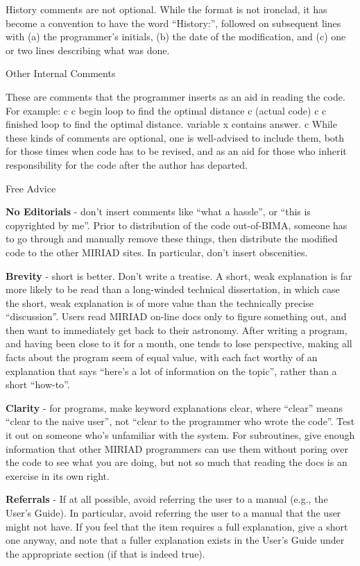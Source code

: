 History comments are not optional.  While the format is not ironclad, it has
become a convention to have the word ``History:'', followed on subsequent
lines with (a) the programmer's initials, (b) the date of the modification,
and (c) one or two lines describing what was done.

\beginsection Other Internal Comments

These are comments that the programmer inserts as an aid in reading the
code.  For example:
{\ninepoint\begintt
c
c begin loop to find the optimal distance
c
    (actual code)
c
c finished loop to find the optimal distance.  variable x contains answer.
c
\endtt}
While these kinds of comments are optional, one is well-advised to include
them, both for those times when code has to be revised, and as an aid for
those who inherit responsibility for the code after the author has departed.

\beginsection Free Advice

{\bf No Editorials} - don't insert comments like ``what a hassle'', or
``this is copyrighted by me''.  Prior to distribution of the code out-of-BIMA,
someone has to go through and manually remove these things, then distribute
the modified code to the other MIRIAD sites.  In particular, don't
insert obscenities.

{\bf Brevity} - short is better.  Don't write a treatise.  A
short, weak explanation is far more likely to be read than a long-winded
technical dissertation, in which case the short, weak explanation is of more
value than the technically precise ``discussion''.  Users read MIRIAD
on-line docs only to figure something out, and then want to immediately get
back to their astronomy.  After writing a program, and having been close to
it for a month, one tends to lose perspective, making all facts about the
program seem of equal value, with each fact worthy of an explanation that
says ``here's a lot of information on the topic'', rather than a short
``how-to''.

{\bf Clarity} - for programs, make keyword explanations
clear, where ``clear'' means ``clear to the naive user'', not ``clear to the
programmer who wrote the code''.  Test it out on someone who's unfamiliar
with the system.  For subroutines, give enough information that other
MIRIAD programmers can use them without poring over the code to see
what you are doing, but not so much that reading the docs is an exercise in
its own right.

{\bf Referrals} - If at all possible, avoid referring the user
to a manual (e.g., the User's Guide).  In particular, avoid referring the
user to a manual that the user might not have.  If you feel that the item
requires a full explanation, give a short one anyway, and note that a fuller
explanation exists in the User's Guide under the appropriate section (if
that is indeed true).
